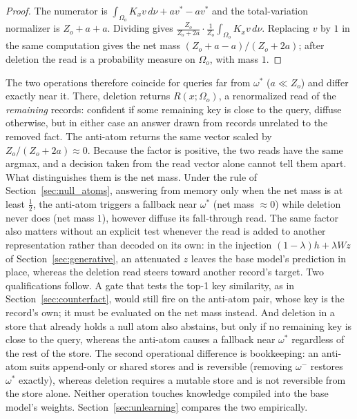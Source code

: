 \documentclass[preprint,12pt]{elsarticle}
\newcommand{\Om}{\Omega}
\newif\ifmarkchanges
\newcommand{\rev}[1]{#1}
\newcommand{\revii}[1]{\ifmarkchanges{\color{blue}#1}\else#1\fi}
\begin{document}
\begin{proof}
\rev{The numerator is $\int_{\Om_o}K_x v\,d\nu+a v^*-a v^*$ and the total-variation normalizer is $Z_o+a+a$. Dividing gives $\frac{Z_o}{Z_o+2a}\cdot\frac{1}{Z_o}\int_{\Om_o}K_x v\,d\nu$.} \revii{Replacing $v$ by $1$ in the same computation gives the net mass $(Z_o+a-a)/(Z_o+2a)$; after deletion the read is a probability measure on $\Om_o$, with mass $1$.} \qedhere
\end{proof}

\rev{The two operations therefore coincide for queries far from $\omega^*$ ($a\ll Z_o$) and differ exactly near it. There, deletion returns $R(x;\Om_o)$, a renormalized read of the \emph{remaining} records: confident if some remaining key is close to the query, diffuse otherwise, but in either case an answer drawn from records unrelated to the removed fact. The anti-atom returns the same vector scaled by $Z_o/(Z_o+2a)\approx0$. \revii{Because the factor is positive, the two reads have the same argmax, and a decision taken from the read vector alone cannot tell them apart. What distinguishes them is the net mass. Under the rule of Section~\ref{sec:null_atoms}, answering from memory only when the net mass is at least $\tfrac12$, the anti-atom triggers a fallback near $\omega^*$ (net mass $\approx0$) while deletion never does (net mass $1$), however diffuse its fall-through read. The same factor also matters without an explicit test whenever the read is added to another representation rather than decoded on its own: in the injection $(1-\lambda)h+\lambda W z$ of Section~\ref{sec:generative}, an attenuated $z$ leaves the base model's prediction in place, whereas the deletion read steers toward another record's target. Two qualifications follow. A gate that tests the top-1 key similarity, as in Section~\ref{sec:counterfact}, would still fire on the anti-atom pair, whose key is the record's own; it must be evaluated on the net mass instead. And deletion in a store that already holds a null atom also abstains, but only if no remaining key is close to the query, whereas the anti-atom causes a fallback near $\omega^*$ regardless of the rest of the store.} The second operational difference is bookkeeping: an anti-atom suits append-only or shared stores and is reversible (removing $\omega^-$ restores $\omega^*$ exactly), whereas deletion requires a mutable store and is not reversible from the store alone. Neither operation touches knowledge compiled into the base model's weights. Section~\ref{sec:unlearning} compares the two empirically.}
\end{document}
